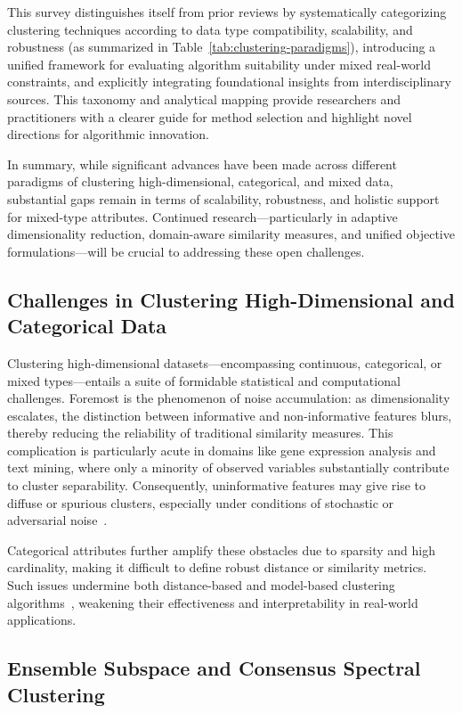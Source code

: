 \documentclass[sigconf]{acmart}
\begin{document}
This survey distinguishes itself from prior reviews by systematically categorizing clustering techniques according to data type compatibility, scalability, and robustness (as summarized in Table~\ref{tab:clustering-paradigms}), introducing a unified framework for evaluating algorithm suitability under mixed real-world constraints, and explicitly integrating foundational insights from interdisciplinary sources. This taxonomy and analytical mapping provide researchers and practitioners with a clearer guide for method selection and highlight novel directions for algorithmic innovation.

In summary, while significant advances have been made across different paradigms of clustering high-dimensional, categorical, and mixed data, substantial gaps remain in terms of scalability, robustness, and holistic support for mixed-type attributes. Continued research—particularly in adaptive dimensionality reduction, domain-aware similarity measures, and unified objective formulations—will be crucial to addressing these open challenges.

\subsection{Challenges in Clustering High-Dimensional and Categorical Data}

Clustering high-dimensional datasets—encompassing continuous, categorical, or mixed types—entails a suite of formidable statistical and computational challenges. Foremost is the phenomenon of noise accumulation: as dimensionality escalates, the distinction between informative and non-informative features blurs, thereby reducing the reliability of traditional similarity measures. This complication is particularly acute in domains like gene expression analysis and text mining, where only a minority of observed variables substantially contribute to cluster separability. Consequently, uninformative features may give rise to diffuse or spurious clusters, especially under conditions of stochastic or adversarial noise~\cite{ref116}. 

Categorical attributes further amplify these obstacles due to sparsity and high cardinality, making it difficult to define robust distance or similarity metrics. Such issues undermine both distance-based and model-based clustering algorithms~\cite{ref116}, weakening their effectiveness and interpretability in real-world applications.

\subsection{Ensemble Subspace and Consensus Spectral Clustering}
\end{document}
